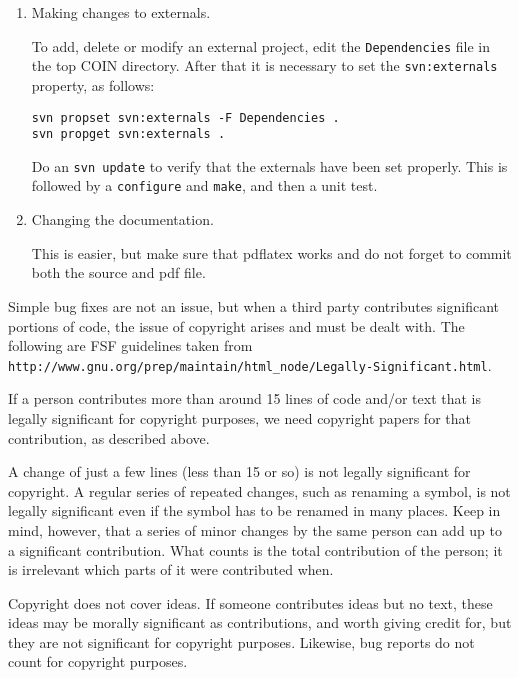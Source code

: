 \begin{enumerate}
\item Making changes to externals.

To add, delete or modify an external project, edit the {\tt Dependencies} file in the top COIN directory.
After that it is necessary to set the {\tt svn:externals} property, as follows:

\begin{verbatim}
svn propset svn:externals -F Dependencies .
svn propget svn:externals .
\end{verbatim}

Do an {\tt svn update} to verify that the externals have been set properly.
This is followed by a  {\tt configure} and {\tt make}, and then a unit test. 

\item Changing the documentation.

This is easier, but make sure that pdflatex works and do not forget to commit both the source and pdf file. 

\end{enumerate}

\label{section:significantChanges}

Simple bug fixes are not an issue, but when a third party contributes significant portions of code, the issue of copyright arises and must be dealt with. The following are FSF guidelines taken from 
{\tt http://www.gnu.org/prep/maintain/html\_node/Legally-Significant.html}.

If a person contributes more than around 15 lines of code and/or text that is legally significant for copyright purposes, we need copyright papers for that contribution, as described above.
 
A change of just a few lines (less than 15 or so) is not legally significant for copyright. A regular series of repeated changes, such as renaming a symbol, is not legally significant even if the symbol has to be renamed in many places. Keep in mind, however, that a series of minor changes by the same person can add up to a significant contribution. What counts is the total contribution of the person; it is irrelevant which parts of it were contributed when.
 
Copyright does not cover ideas. If someone contributes ideas but no text, these ideas may be morally significant as contributions, and worth giving credit for, but they are not significant for copyright purposes. Likewise, bug reports do not count for copyright purposes.
 
